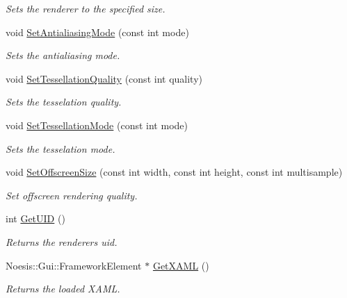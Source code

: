 \begin{DoxyCompactItemize}
\begin{DoxyCompactList}\small\item\em Sets the renderer to the specified size. \end{DoxyCompactList}\item 
void \hyperlink{class_u_i_renderer_a05d5fed9d98c02a150efeb8e6ea36812}{Set\-Antialiasing\-Mode} (const int mode)
\begin{DoxyCompactList}\small\item\em Sets the antialiasing mode. \end{DoxyCompactList}\item 
void \hyperlink{class_u_i_renderer_a77ab17ad59e589eb32d55699ea1ab1c6}{Set\-Tessellation\-Quality} (const int quality)
\begin{DoxyCompactList}\small\item\em Sets the tesselation quality. \end{DoxyCompactList}\item 
void \hyperlink{class_u_i_renderer_a54d4d9236175ecca2568dffa8f6a60e6}{Set\-Tessellation\-Mode} (const int mode)
\begin{DoxyCompactList}\small\item\em Sets the tesselation mode. \end{DoxyCompactList}\item 
void \hyperlink{class_u_i_renderer_ad8eacb018b912e5d7786ca6f1642b4ce}{Set\-Offscreen\-Size} (const int width, const int height, const int multisample)
\begin{DoxyCompactList}\small\item\em Set offscreen rendering quality. \end{DoxyCompactList}\item 
int \hyperlink{class_u_i_renderer_a45454e14885545c166a795d4a0884a38}{Get\-U\-I\-D} ()
\begin{DoxyCompactList}\small\item\em Returns the renderers uid. \end{DoxyCompactList}\item 
Noesis\-::\-Gui\-::\-Framework\-Element $\ast$ \hyperlink{class_u_i_renderer_a0989015bf54f7b6c624829c1fbf284d7}{Get\-X\-A\-M\-L} ()
\begin{DoxyCompactList}\small\item\em Returns the loaded X\-A\-M\-L. \end{DoxyCompactList}\end{DoxyCompactItemize}
